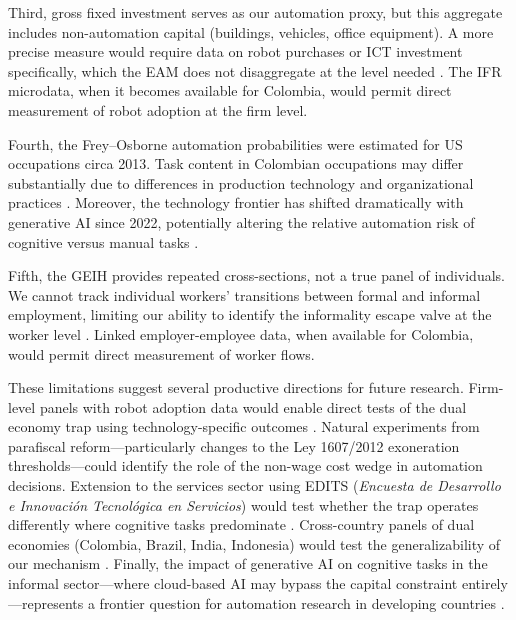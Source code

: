 \documentclass[5p,times,authoryear]{elsarticle}
\begin{document}
Third, gross fixed investment serves as our automation proxy, but this aggregate includes non-automation capital (buildings, vehicles, office equipment). A more precise measure would require data on robot purchases or ICT investment specifically, which the EAM does not disaggregate at the level needed \citep{diao2021manufacturing}. The IFR microdata, when it becomes available for Colombia, would permit direct measurement of robot adoption at the firm level.

Fourth, the Frey--Osborne automation probabilities were estimated for US occupations circa 2013. Task content in Colombian occupations may differ substantially due to differences in production technology and organizational practices \citep{atkin2017organizational, cirera2017innovation}. Moreover, the technology frontier has shifted dramatically with generative AI since 2022, potentially altering the relative automation risk of cognitive versus manual tasks \citep{eloundou2023gpts, aghion2019ai}.

Fifth, the GEIH provides repeated cross-sections, not a true panel of individuals. We cannot track individual workers' transitions between formal and informal employment, limiting our ability to identify the informality escape valve at the worker level \citep{levy2008good}. Linked employer-employee data, when available for Colombia, would permit direct measurement of worker flows.

These limitations suggest several productive directions for future research. Firm-level panels with robot adoption data would enable direct tests of the dual economy trap using technology-specific outcomes \citep{bessen2019automation, autor2018automation}. Natural experiments from parafiscal reform---particularly changes to the Ley 1607/2012 exoneration thresholds---could identify the role of the non-wage cost wedge in automation decisions. Extension to the services sector using EDITS (\textit{Encuesta de Desarrollo e Innovaci\'{o}n Tecnol\'{o}gica en Servicios}) would test whether the trap operates differently where cognitive tasks predominate \citep{baldwin2019globotics}. Cross-country panels of dual economies (Colombia, Brazil, India, Indonesia) would test the generalizability of our mechanism \citep{hallward2018trouble, schlogl2020disrupted}. Finally, the impact of generative AI on cognitive tasks in the informal sector---where cloud-based AI may bypass the capital constraint entirely---represents a frontier question for automation research in developing countries \citep{korinek2021ai, susskind2020world}.
\end{document}
